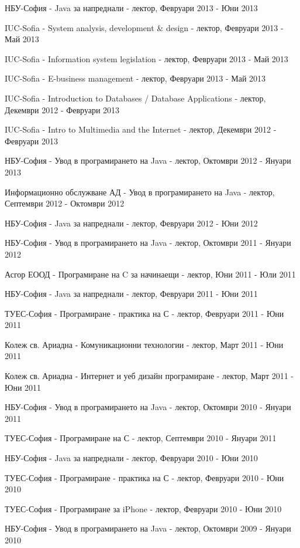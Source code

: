 \documentclass[bulgarian,a4paper]{europasscv}
\begin{document}
\begin{europasscv}
{\begin{ecvitemize}
    \item НБУ-София - Java за напреднали - лектор, Февруари 2013 - Юни 2013
    \item IUC-Sofia - System analysis, development \& design - лектор, Февруари 2013 - Май 2013
    \item IUC-Sofia - Information system legislation - лектор, Февруари 2013 - Май 2013
    \item IUC-Sofia - E-business management - лектор, Февруари 2013 - Май 2013
    \item IUC-Sofia - Introduction to Databases / Database Applications - лектор, Декември 2012 - Февруари 2013
    \item IUC-Sofia - Intro to Multimedia and the Internet - лектор, Декември 2012 - Февруари 2013
    \item НБУ-София - Увод в програмирането на Java - лектор, Октомври 2012 - Януари 2013
    \item Информационно обслужване АД - Увод в програмирането на Java - лектор, Септември 2012 - Октомври 2012
    \item НБУ-София - Java за напреднали - лектор, Февруари 2012 - Юни 2012
    \item НБУ-София - Увод в програмирането на Java - лектор, Октомври 2011 - Януари 2012
    \item Асгор ЕООД - Програмиране на C за начинаещи - лектор, Юни 2011 - Юли 2011
    \item НБУ-София - Java за напреднали - лектор, Февруари 2011 - Юни 2011
    \item ТУЕС-София - Програмиране - практика на С - лектор, Февруари 2011 - Юни 2011
    \item Колеж св. Ариадна - Комуникационни технологии - лектор, Март 2011 - Юни 2011
    \item Колеж св. Ариадна - Интернет и уеб дизайн програмиране - лектор, Март 2011 - Юни 2011
    \item НБУ-София - Увод в програмирането на Java - лектор, Октомври 2010 - Януари 2011
    \item ТУЕС-София - Програмиране на С - лектор, Септември 2010 - Януари 2011
    \item НБУ-София - Java за напреднали - лектор, Февруари 2010 - Юни 2010
    \item ТУЕС-София - Програмиране - практика на С - лектор, Февруари 2010 - Юни 2010
    \item ТУЕС-София - Програмиране за iPhone - лектор, Февруари 2010 - Юни 2010
    \item НБУ-София - Увод в програмирането на Java - лектор, Октомври 2009 - Януари 2010

\end{ecvitemize}}
\end{europasscv}
\end{document}
